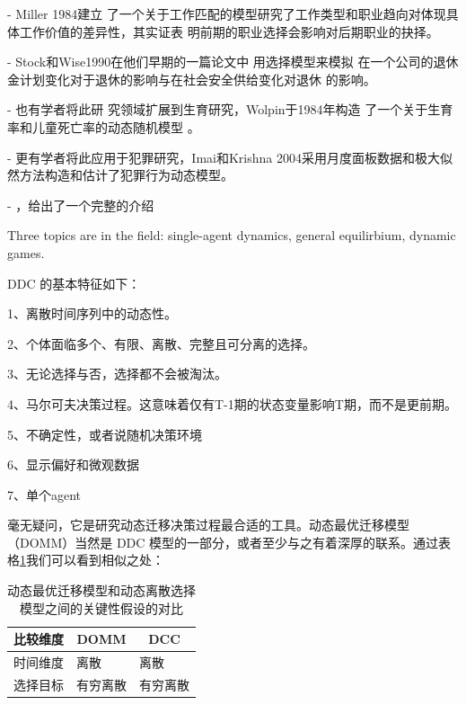 \documentclass[a4paper,12pt,oneside]{book} %
\begin{document}
- Miller 1984建立 了一个关于工作匹配的模型研究了工作类型和职业趋向对体现具体工作价值的差异性，其实证表 明前期的职业选择会影响对后期职业的抉择。

- Stock和Wise1990在他们早期的一篇论文中 用选择模型来模拟  在一个公司的退休金计划变化对于退休的影响与在社会安全供给变化对退休 的影响。

- 也有学者将此研 究领域扩展到生育研究，Wolpin于1984年构造 了一个关于生育率和儿童死亡率的动态随机模型 。

- 更有学者将此应用于犯罪研究，Imai和Krishna 2004采用月度面板数据和极大似然方法构造和估计了犯罪行为动态模型。

- \cite{keaneEmpiricalApplicationsDiscrete2009}，\cite{aguirregabiriaDynamicDiscreteChoice2010}给出了一个完整的介绍

Three topics are in the field: single-agent dynamics, general equilirbium, dynamic games.

\cite{keaneStructuralEstimationBehavioral2011}

\cite{toddStructuralEstimationPolicy2010}


DDC 的基本特征如下：

1、离散时间序列中的动态性。

2、个体面临多个、有限、离散、完整且可分离的选择。

3、无论选择与否，选择都不会被淘汰。

4、马尔可夫决策过程。这意味着仅有T-1期的状态变量影响T期，而不是更前期。

5、不确定性，或者说随机决策环境

6、显示偏好和微观数据

7、单个agent



毫无疑问，它是研究动态迁移决策过程最合适的工具。动态最优迁移模型（DOMM）当然是 DDC 模型的一部分，或者至少与之有着深厚的联系。通过表格\ref{tab:DOMM和DDC假设的对比}我们可以看到相似之处：

\begin{table}
\centering
\begin{tabularx}{\textwidth}{@{}cXX@{}} 
\toprule
\textbf{比较维度} & \multicolumn{1}{c}{\textbf{DOMM}} & \multicolumn{1}{c}{\textbf{DCC}} \\ \midrule
时间维度 & 离散 & 离散 \\
选择目标 &有穷离散&有穷离散\\
\bottomrule  
\end{tabularx}
\caption{动态最优迁移模型和动态离散选择模型之间的关键性假设的对比}
\label{tab:DOMM和DDC假设的对比}  
\end{table}
\end{document}
